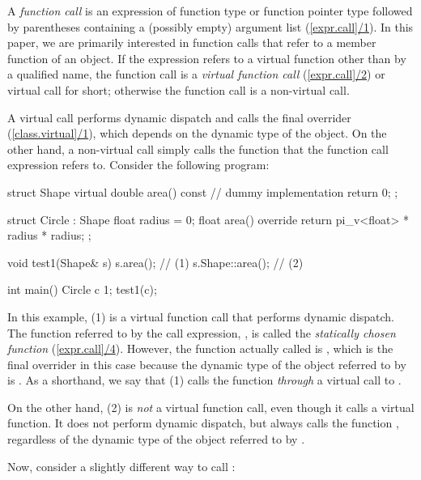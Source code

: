 A \emph{function call} is an expression of function type or function pointer type followed by parentheses containing a (possibly empty) argument list (\href{https://eel.is/c++draft/expr.call#1}{[expr.call]/1}). In this paper, we are primarily interested in function calls that refer to a member function of an object. If the expression refers to a virtual function other than by a qualified name, the function call is a \emph{virtual function call} (\href{https://eel.is/c++draft/expr.call#2}{[expr.call]/2}) or virtual call for short; otherwise the function call is a non-virtual call.

A virtual call performs dynamic dispatch and calls the final overrider (\href{https://eel.is/c++draft/expr.call#2.sentence-2}{[class.virtual]/1}), which depends on the dynamic type of the object. On the other hand, a non-virtual call simply calls the function that the function call expression refers to. Consider the following program:

\begin{codeblock}
struct Shape {
  virtual double area() const { 
    // dummy implementation
    return 0; 
  }
};

struct Circle : Shape {
  float radius = 0;
  float area() override { 
    return pi_v<float> * radius * radius; 
  }
};

void test1(Shape& s) {
  s.area();        // (1)
  s.Shape::area(); // (2)
}

int main() {
  Circle c {1};
  test1(c);
}
\end{codeblock}

In this example, (1) is a virtual function call that performs dynamic dispatch. The function referred to by the call expression, , is called the \emph{statically chosen function} (\href{https://eel.is/c++draft/expr.call#4.sentence-1}{[expr.call]/4}). However, the function actually called is , which is the final overrider in this case because the dynamic type of the object referred to by  is . As a shorthand, we say that (1) calls the function  \emph{through} a virtual call to .

On the other hand, (2) is \emph{not} a virtual function call, even though it calls a virtual function. It does not perform dynamic dispatch, but always calls the function , regardless of the dynamic type of the object referred to by .

Now, consider a slightly different way to call :

